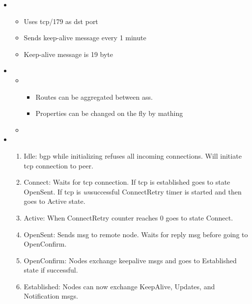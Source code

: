 \begin{itemize}
    \item {}
    \begin{itemize}
        \item Uses tcp/179 as \gls{dst} port
        \item Sends keep-alive message every 1 minute
        \item Keep-alive message is 19 byte
    \end{itemize}
    \item {}
    \begin{itemize}
        \item {}
        \begin{itemize}
            \item Routes can be aggregated between \Glspl{as}.
            \item Properties can be changed on the fly by mathing
        \end{itemize}
        \item 
    \end{itemize}
    \item {}
    \begin{enumerate}
        \item Idle: \Gls{bgp} while initializing refuses all incoming connections. Will initiate \Gls{tcp} connection to peer.
        \item Connect: Waits for \Gls{tcp} connection. If \Gls{tcp} is established goes to state OpenSent. If \Gls{tcp} is \textit{un}successful ConnectRetry timer is started and then goes to Active state.
        \item Active: When ConnectRetry counter reaches 0 goes to state Connect.
        \item OpenSent: Sends \gls{msg} to remote node. Waits for reply \gls{msg} before going to OpenConfirm.
        \item OpenConfirm: Nodes exchange keepalive \glspl{msg} and goes to Established state if successful.
        \item Established: Nodes can now exchange KeepAlive, Updates, and Notification \glspl{msg}.
    \end{enumerate}
\end{itemize}


